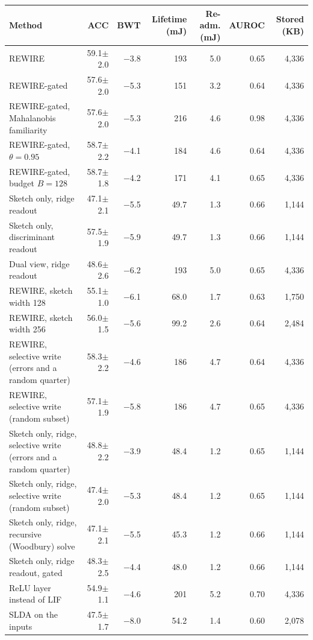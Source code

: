 \begin{tabular*}{\textwidth}{@{\extracolsep{\fill}}lrrrrrr@{}}
\toprule
Method & ACC & BWT & Lifetime (mJ) & Re-adm. (mJ) & AUROC & Stored (KB) \\
\midrule
REWIRE & 59.1$\pm$2.0 & \ensuremath{-}3.8 & 193 & 5.0 & 0.65 & 4,336 \\
REWIRE-gated & 57.6$\pm$2.0 & \ensuremath{-}5.3 & 151 & 3.2 & 0.64 & 4,336 \\
REWIRE-gated, Mahalanobis familiarity & 57.6$\pm$2.0 & \ensuremath{-}5.3 & 216 & 4.6 & 0.98 & 4,336 \\
REWIRE-gated, $\theta=0.95$ & 58.7$\pm$2.2 & \ensuremath{-}4.1 & 184 & 4.6 & 0.64 & 4,336 \\
REWIRE-gated, budget $B=128$ & 58.7$\pm$1.8 & \ensuremath{-}4.2 & 171 & 4.1 & 0.65 & 4,336 \\
Sketch only, ridge readout & 47.1$\pm$2.1 & \ensuremath{-}5.5 & 49.7 & 1.3 & 0.66 & 1,144 \\
Sketch only, discriminant readout & 57.5$\pm$1.9 & \ensuremath{-}5.9 & 49.7 & 1.3 & 0.66 & 1,144 \\
Dual view, ridge readout & 48.6$\pm$2.6 & \ensuremath{-}6.2 & 193 & 5.0 & 0.65 & 4,336 \\
REWIRE, sketch width 128 & 55.1$\pm$1.0 & \ensuremath{-}6.1 & 68.0 & 1.7 & 0.63 & 1,750 \\
REWIRE, sketch width 256 & 56.0$\pm$1.5 & \ensuremath{-}5.6 & 99.2 & 2.6 & 0.64 & 2,484 \\
REWIRE, selective write (errors and a random quarter) & 58.3$\pm$2.2 & \ensuremath{-}4.6 & 186 & 4.7 & 0.64 & 4,336 \\
REWIRE, selective write (random subset) & 57.1$\pm$1.9 & \ensuremath{-}5.8 & 186 & 4.7 & 0.65 & 4,336 \\
Sketch only, ridge, selective write (errors and a random quarter) & 48.8$\pm$2.2 & \ensuremath{-}3.9 & 48.4 & 1.2 & 0.65 & 1,144 \\
Sketch only, ridge, selective write (random subset) & 47.4$\pm$2.0 & \ensuremath{-}5.3 & 48.4 & 1.2 & 0.65 & 1,144 \\
Sketch only, ridge, recursive (Woodbury) solve & 47.1$\pm$2.1 & \ensuremath{-}5.5 & 45.3 & 1.2 & 0.66 & 1,144 \\
Sketch only, ridge readout, gated & 48.3$\pm$2.5 & \ensuremath{-}4.4 & 48.0 & 1.2 & 0.66 & 1,144 \\
ReLU layer instead of LIF & 54.9$\pm$1.1 & \ensuremath{-}4.6 & 201 & 5.2 & 0.70 & 4,336 \\
SLDA on the inputs & 47.5$\pm$1.7 & \ensuremath{-}8.0 & 54.2 & 1.4 & 0.60 & 2,078 \\

\end{tabular*}
